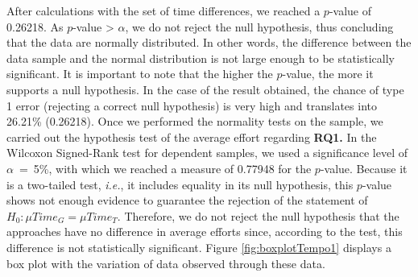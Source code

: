 After calculations with the set of time differences, we reached a $p$-value of 0.26218.
As $p$-value > $\alpha$, we do not reject the null hypothesis, thus concluding that the data are normally distributed.
In other words, the difference between the data sample and the normal distribution is not large enough to be statistically significant.
It is important to note that the higher the $p$-value, the more it supports a null hypothesis.
In the case of the result obtained, the chance of type 1 error (rejecting a correct null hypothesis) is very high and translates into 26.21\% (0.26218).
Once we performed the normality tests on the sample, we carried out the hypothesis test of the average effort regarding \textbf{RQ1.}
In the Wilcoxon Signed-Rank test for dependent samples, we used a significance level of $\alpha$~=~5\%, with which we reached a measure of 0.77948 for the $p$-value.
Because it is a two-tailed test, \textit{i.e.}, it includes equality in its null hypothesis, this $p$-value shows not enough evidence to guarantee the rejection of the statement of $H_0: \mu Time_G = \mu Time_T$.
Therefore, we do not reject the null hypothesis that the approaches have no difference in average efforts since, according to the test, this difference is not statistically significant. 
Figure \ref{fig:boxplotTempo1} displays a box plot with the variation of data observed through these data.

%     

